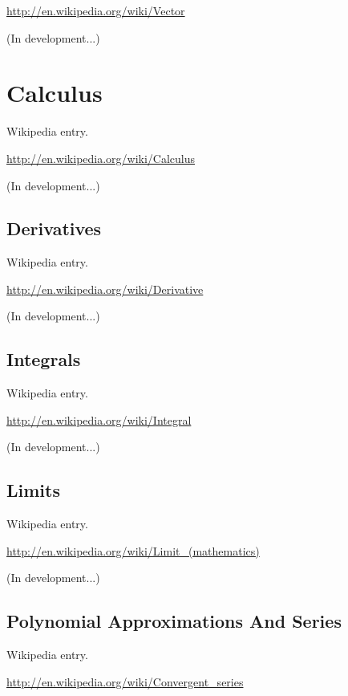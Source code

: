 \documentclass[12pt,oneside]{book}
\begin{document}
\href{http://en.wikipedia.org/wiki/Vector}{http://en.wikipedia.org/wiki/Vector}

(In development...)

\section[Calculus]{Calculus}

Wikipedia entry.

\href{http://en.wikipedia.org/wiki/Calculus}{http://en.wikipedia.org/wiki/Calculus}

(In development...)

\subsection[Derivatives]{Derivatives}

Wikipedia entry.

\href{http://en.wikipedia.org/wiki/Derivative}{http://en.wikipedia.org/wiki/Derivative}

(In development...)

\subsection[Integrals]{Integrals}

Wikipedia entry.

\href{http://en.wikipedia.org/wiki/Integral}{http://en.wikipedia.org/wiki/Integral}

(In development...)

\subsection[Limits]{Limits}

Wikipedia entry.

\href{http://en.wikipedia.org/wiki/Limit_(mathematics)}{http://en.wikipedia.org/wiki/Limit\_(mathematics)}

(In development...)

\subsection[Polynomial Approximations And Series]{ Polynomial Approximations And Series}

Wikipedia entry.

\href{http://en.wikipedia.org/wiki/Convergent_series}{http://en.wikipedia.org/wiki/Convergent\_series}
\end{document}
